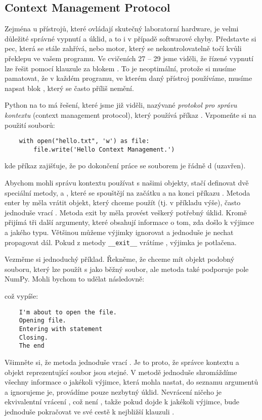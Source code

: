 \subsection{Context Management Protocol}
Zejména u přístrojů, které ovládají skutečný laboratorní hardware, je velmi důležité správné vypnutí a úklid, a to i v případě softwarové chyby. Představte si pec, která se stále zahřívá, nebo motor, který se nekontrolovatelně točí kvůli překlepu ve vašem programu. Ve cvičeních 27 -- 29 jsme viděli, že řízené vypnutí lze řešit pomocí klauzule  za blokem . To je neoptimální, protože si musíme pamatovat, že v každém programu, ve kterém daný přístroj používáme, musíme napsat blok , který se často příliš nemění.

Python na to má řešení, které jsme již viděli, nazývané \emph{protokol pro správu kontextu} (context management protocol), který používá příkaz . Vzpomeňte si na použití souborů:
\begin{lstlisting}
    with open("hello.txt", 'w') as file:
        file.write('Hello Context Management.')
\end{lstlisting}
kde příkaz  zajišťuje, že po dokončení práce se souborem je řádně d (uzavřen).

Abychom mohli správu kontextu používat s našimi objekty, stačí definovat dvě speciální metody,  a , které se spouštějí na začátku a na konci příkazu . Metoda enter by měla vrátit objekt, který chceme použít (tj.  v příkladu výše), často jednoduše vrací . Metoda exit by měla provést veškerý potřebný úklid. Kromě  přijímá tři další argumenty, které obsahují informace o tom, zda došlo k výjimce a jakého typu. Většinou můžeme výjimky ignorovat a jednoduše je nechat propagovat dál. Pokud z metody \verb|__exit__| vrátíme , výjimka je potlačena.

Vezměme si jednoduchý příklad. Řekněme, že chceme mít objekt podobný souboru, který lze použít s  jako běžný soubor, ale metoda  také podporuje pole NumPy. Mohli bychom to udělat následovně:

což vypíše:
\begin{verbatim}
    I'm about to open the file.
    Opening file.
    Entering with statement
    Closing.
    The end
\end{verbatim}

Všimněte si, že metoda  jednoduše vrací . Je to proto, že správce kontextu a objekt reprezentující soubor jsou stejné. V metodě  jednoduše shromáždíme všechny informace o jakékoli výjimce, která mohla nastat, do seznamu argumentů  a ignorujeme je, provádíme pouze nezbytný úklid. Nevrácení ničeho je ekvivalentní vrácení , což není , takže pokud dojde k jakékoli výjimce, bude jednoduše pokračovat ve své cestě k nejbližší klauzuli .

